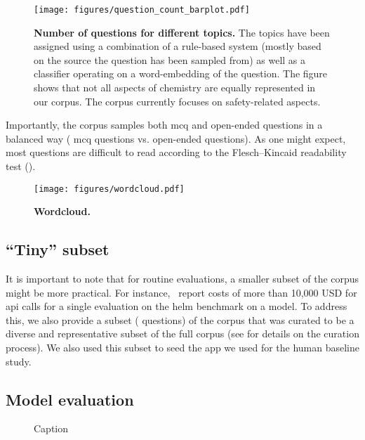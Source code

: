 \documentclass[11pt, oneside]{article}
\begin{document}
\begin{figure}
    \centering
    \texttt{[image: figures/question\_count\_barplot.pdf]}
    \caption{\textbf{Number of questions for different topics.} The topics have been assigned using a combination of a rule-based system (mostly based on the source the question has been sampled from) as well as a classifier operating on a word-embedding of the question. The figure shows that not all aspects of chemistry are equally represented in our corpus. The corpus currently focuses on safety-related aspects.}
    \label{fig:topic_barplot}
\end{figure}

Importantly, the corpus samples both \gls{mcq} and open-ended questions in a balanced way ( \gls{mcq} questions vs.  open-ended questions).
As one might expect, most questions are difficult to read according to the Flesch–Kincaid readability test ().~\cite{kincaid1975derivation}


\begin{figure}
    \centering
    \texttt{[image: figures/wordcloud.pdf]}
    \caption{\textbf{Wordcloud.}}
    \label{fig:wordcloud}
\end{figure}


\subsection{\enquote{Tiny} subset}
It is important to note that for routine evaluations, a smaller subset of the corpus might be more practical.\cite{polo2024tinybenchmarks}
For instance,~\citet{liang2023holistic} report costs of more than 10,000 USD for \gls{api} calls for a single evaluation on the \gls{helm} benchmark on a model. 
To address this, we also provide a subset ( questions) of the corpus that was curated to be a diverse and representative subset of the full corpus (see  for details on the curation process).
We also used this subset to seed the app we used for the human baseline study. 


\subsection{Model evaluation}


\begin{figure}
    \centering
    \caption{Caption}
    \label{fig:enter-label}
\end{figure}
\end{document}
